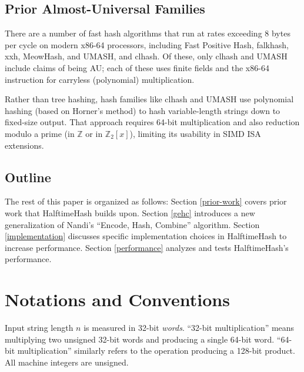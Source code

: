 \documentclass{llncs}
\newcommand{\ints}{\mathbb{Z}}
\begin{document}

\subsection{Prior Almost-Universal Families}

There are a number of fast hash algorithms that run at rates exceeding 8 bytes per cycle on modern x86-64 processors, including Fast Positive Hash, falk\-hash, xxh, Meow\-Hash, and UMASH, and cl\-hash. \cite{smhasher}
Of these, only cl\-hash and U\-MASH include claims of being AU; each of these uses finite fields and the x86-64 instruction for carryless (polynomial) multiplication.

Rather than tree hashing, hash families like clhash and UMASH use polynomial hashing (based on Horner's method) to hash variable-length strings down to fixed-size output.
That approach requires 64-bit multiplication and also reduction modulo a prime (in $\ints$ or in $\ints_2[x]$), limiting its usability in SIMD ISA extensions.



\subsection{Outline}

The rest of this paper is organized as follows: Section \ref{prior-work} covers prior work that HalftimeHash builds upon.
Section \ref{gehc} introduces a new generalization of Nandi's ``Encode, Hash, Combine'' algorithm.\cite{ehc-nandi}
Section \ref{implementation} discusses specific implementation choices in HalftimeHash to increase performance.
Section \ref{performance} analyzes and tests HalftimeHash's performance.

\section{Notations and Conventions}

Input string length $n$ is measured in 32-bit {\em words}.
``32-bit multiplication'' means multiplying two unsigned 32-bit words and producing a single 64-bit word.
``64-bit multiplication'' similarly refers to the operation producing a 128-bit product.
All machine integers are unsigned.
\end{document}
